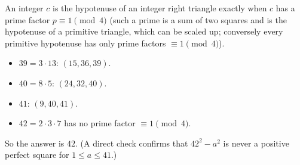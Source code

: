 An integer $c$ is the hypotenuse of an integer right triangle exactly when $c$ has a prime factor $p\equiv1\pmod4$ (such a prime is a sum of two squares and is the hypotenuse of a primitive triangle, which can be scaled up; conversely every primitive hypotenuse has only prime factors $\equiv1\pmod4$).
\begin{itemize}
\item $39=3\cdot13$: $(15,36,39)$.
\item $40=8\cdot5$: $(24,32,40)$.
\item $41$: $(9,40,41)$.
\item $42=2\cdot3\cdot7$ has no prime factor $\equiv1\pmod4$.
\end{itemize}
So the answer is $\boxed{42}$. (A direct check confirms that $42^2-a^2$ is never a positive perfect square for $1\le a\le41$.)
